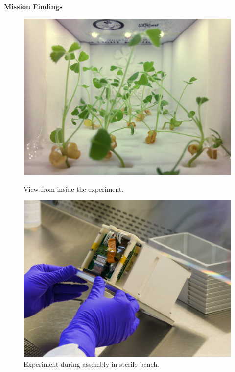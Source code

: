 \documentclass[english,final,20pt,leqno,print]{beamer}
\begin{document}
\begin{frame}[t]
\begin{columns}[T]
\begin{column}{.49\textwidth}
  \begin{block}{\strut{}\textbf{Mission Findings}}
\begin{figure}
\begin{minipage}[c]{0.49\textwidth}
\vspace{-26pt}
\includegraphics[width=\textwidth]{img/experiment_edit.jpeg}
\caption{View from inside the experiment.}
\end{minipage}
\hfill
\begin{minipage}[c]{0.49\textwidth}
\vspace{10pt}
\includegraphics[width=\textwidth]{img/DSC_5297_edited_blue_small.jpg}
\caption{Experiment during assembly in sterile bench.}
\end{minipage}%
\end{figure}


\end{block}
\end{column}
\end{columns}
\end{frame}
\end{document}
